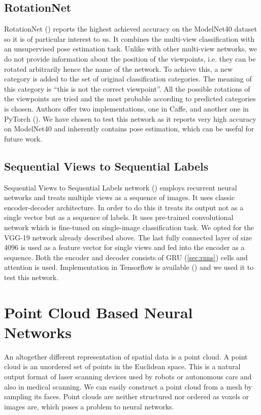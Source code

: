 \subsection{RotationNet}
RotationNet (\cite{kanezaki_rotationnet:_2018}) reports the highest achieved accuracy on the ModelNet40 dataset so it is of particular interest to us. It combines the multi-view classification with an unsupervised pose estimation task. Unlike with other multi-view networks, we do not provide information about the position of the viewpoints, i.e. they can be rotated arbitrarily hence the name of the network. 
To achieve this, a new category is added to the set of original classification categories. The meaning of this category is “this is not the correct viewpoint”. All the possible rotations of the viewpoints are tried and the most probable according to predicted categories is chosen. Authors offer two implementations, one in Caffe, and another one in PyTorch (\cite{kanezaki_rotationnet_2018}). We have chosen to test this network as it reports very high accuracy on ModelNet40 and inherently contains pose estimation, which can be useful for future work.

\subsection{Sequential Views to Sequential Labels}
Sequential Views to Sequential Labels network (\cite{zhizhong_seqviews2seqlabels:_2018}) employs recurrent neural networks and treats multiple views as a sequence of images. It uses classic encoder-decoder architecture. In order to do this it treats its output not as a single vector but as a sequence of labels. It uses pre-trained convolutional network which is fine-tuned on single-image classification task. We opted for the VGG-19 network already described above. The last fully connected layer of size 4096 is used as a feature vector for single views and fed into the encoder as a sequence. Both the encoder and decoder consists of GRU (\autoref{sec:rnns}) cells and attention is used. Implementation in Tensorflow is available (\cite{zhizhong_seq2seq_2018}) and we used it to test this network.

\section{Point Cloud Based Neural Networks}
An altogether different representation of spatial data is a point cloud. A point cloud is an unordered set of points in the Euclidean space. This is a natural output format of laser scanning devices used by robots or autonomous cars and also in medical scanning. We can easily construct a point cloud from a mesh by sampling its faces. Point clouds are neither structured nor ordered as voxels or images are, which poses a problem to neural networks.

